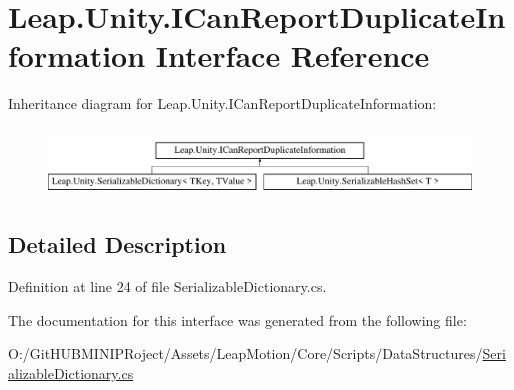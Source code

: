 \hypertarget{interface_leap_1_1_unity_1_1_i_can_report_duplicate_information}{}\section{Leap.\+Unity.\+I\+Can\+Report\+Duplicate\+Information Interface Reference}
\label{interface_leap_1_1_unity_1_1_i_can_report_duplicate_information}
Inheritance diagram for Leap.\+Unity.\+I\+Can\+Report\+Duplicate\+Information\+:\begin{figure}[H]
\begin{center}
\leavevmode
\includegraphics[height=1.806452cm]{interface_leap_1_1_unity_1_1_i_can_report_duplicate_information}
\end{center}
\end{figure}


\subsection{Detailed Description}


Definition at line 24 of file Serializable\+Dictionary.\+cs.



The documentation for this interface was generated from the following file\+:\begin{DoxyCompactItemize}
\item 
O\+:/\+Git\+H\+U\+B\+M\+I\+N\+I\+P\+Roject/\+Assets/\+Leap\+Motion/\+Core/\+Scripts/\+Data\+Structures/\mbox{\hyperlink{_serializable_dictionary_8cs}{Serializable\+Dictionary.\+cs}}\end{DoxyCompactItemize}
